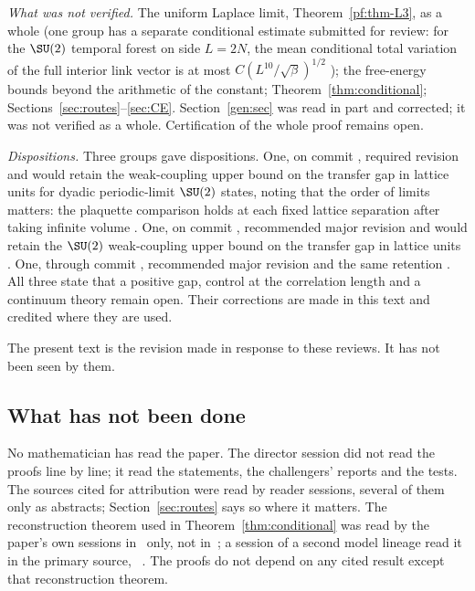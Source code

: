 \emph{What was not verified.} The uniform Laplace limit, Theorem~\ref{pf:thm-L3}, as a whole (one group has a separate conditional estimate submitted for review: for the $\SU(2)$ temporal forest on side $L=2N$, the mean conditional total variation of the full interior link vector is at most $C(L^{10}/\sqrt\beta)^{1/2}$ \cite[comment 7105447358]{RepoThread}); the free-energy bounds beyond the arithmetic of the constant; Theorem~\ref{thm:conditional}; Sections~\ref{sec:routes}--\ref{sec:CE}. Section~\ref{gen:sec} was read in part and corrected; it was not verified as a whole. Certification of the whole proof remains open.

\emph{Dispositions.} Three groups gave dispositions. One, on commit , required revision and would retain the weak-coupling upper bound on the transfer gap in lattice units for dyadic periodic-limit $\SU(2)$ states, noting that the order of limits matters: the plaquette comparison holds at each fixed lattice separation after taking infinite volume \cite[comment 7105100783]{RepoThread}. One, on commit , recommended major revision and would retain the $\SU(2)$ weak-coupling upper bound on the transfer gap in lattice units \cite[comment 7105348719]{RepoThread}. One, through commit , recommended major revision and the same retention \cite[comment 7105447358]{RepoThread}. All three state that a positive gap, control at the correlation length and a continuum theory remain open. Their corrections are made in this text and credited where they are used.

The present text is the revision made in response to these reviews. It has not been seen by them.

\subsection{What has not been done}
No mathematician has read the paper. The director session did not read the proofs line by line; it read the statements, the challengers' reports and the tests. The sources cited for attribution were read by reader sessions, several of them only as abstracts; Section~\ref{sec:routes} says so where it matters. The reconstruction theorem used in Theorem~\ref{thm:conditional} was read by the paper's own sessions in~\cite{KQR21} only, not in~\cite{OS73,OS75}; a session of a second model lineage read it in the primary source, \cite[Section~IV.1]{OS75}~\cite[comments 7104829352, 7105100783]{RepoThread}. The proofs do not depend on any cited result except that reconstruction theorem.

